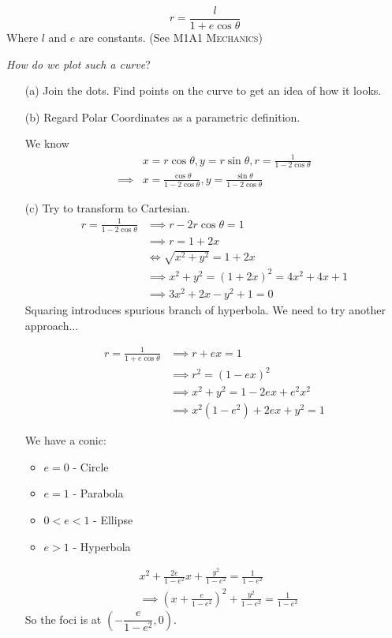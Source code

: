 \documentclass[twoside]{scrartcl}
\begin{document}
\begin{example}
\[r = \frac{l}{1 + e\cos\theta}\]	
Where $l$ and $e$ are constants. (See \textsc{M1A1 Mechanics}) 

\emph{How do we plot such a curve}?

\begin{itemize}
  \item[(a)] Join the dots. Find points on the curve to get an idea of how it looks.
  
  \item[(b)] Regard Polar Coordinates as a parametric definition.

	We know
\[\begin{aligned}
	&x = r\cos\theta, y = r\sin\theta, r = \frac{1}{1-2\cos\theta}  \\[0.2cm]
\implies &x = \frac{\cos\theta}{1-2\cos\theta}, y= \frac{\sin\theta}{1-2\cos\theta}
\end{aligned}\] 
	
\item[(c)] Try to transform to Cartesian.
\[
\begin{aligned}
    r = \frac{1}{1-2\cos\theta} &\implies r - 2r\cos\theta = 1\\
    &\implies r = 1 + 2x\\
    &\iff \sqrt{x^2 + y^2} = 1+2x\\
    &\implies x^2 + y^2 = (1+2x)^2 = 4x^2 + 4x + 1\\
    &\implies 3x^2 + 2x - y^2 + 1 = 0
\end{aligned}
\]
Squaring introduces spurious branch of hyperbola. We need to try another approach...

\[
\begin{aligned}
  r = \frac{1}{1 + e\cos\theta} &\implies r + ex = 1\\
  &\implies r^2 = (1-ex)^2\\
  &\implies x^2 + y^2 = 1-2ex + e^2x^2\\
  &\implies x^2(1-e^2) + 2ex + y^2 = 1
\end{aligned}
\]

We have a conic: 
\begin{itemize}
  \item $e = 0$ - Circle
  \item $e = 1$ - Parabola
  \item $0 < e < 1$ - Ellipse
  \item $e > 1$ - Hyperbola
\end{itemize}

\[
\begin{aligned}
  &x^2 + \frac{2e}{1-e^2}x + \frac{y^2}{1-e^2} = \frac{1}{1-e^2}\\
  &\implies \left(x + \frac{e}{1-e^2}\right)^2 +  \frac{y^2}{1-e^2} = \frac{1}{1-e^2}
\end{aligned}
\]
So the foci is at $\left(-\dfrac{e}{1-e^2},0\right)$.   
\end{itemize}
\end{example}\vspace*{5pt}
\end{document}
